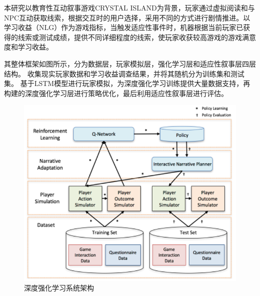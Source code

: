 \documentclass{article}
\begin{document}
            本研究以教育性互动叙事游戏CRYSTAL ISLAND为背景，玩家通过虚拟阅读和与NPC互动获取线索，根据交互时的用户选择，采用不同的方式进行剧情推进。以学习收益（NLG）作为游戏指标，当触发适应性事件时，机器根据当前玩家已获得的线索或测试成绩，提供不同详细程度的线索，使玩家收获较高游戏的游戏满意度和学习收益。
            
            其整体框架如图所示，分为数据层，玩家模拟层，强化学习层和适应性叙事层四层结构。
            收集现实玩家数据和学习收益调查结果，并将其随机分为训练集和测试集。
            基于LSTM模型进行玩家模拟，为深度强化学习训练提供大量数据支持，再构建的深度强化学习层进行策略优化，最后利用适应性叙事层进行评估。
            \begin{figure}[H]
            	
            	\centering
            	\includegraphics[scale=0.5]{images/RL_architecture.png}
            	\caption{深度强化学习系统架构}
            	\label{fig:label}
            \end{figure}
\end{document}
